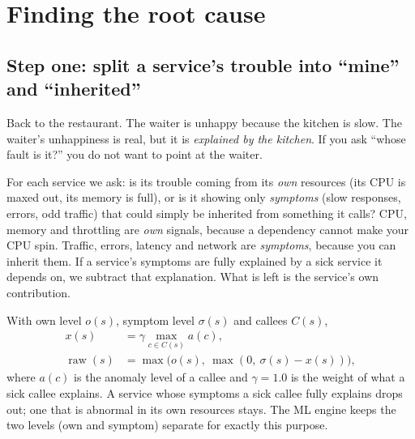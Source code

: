 \chapter{Finding the root cause}
\label{ch:rank}

\section{Step one: split a service's trouble into ``mine'' and ``inherited''}
\begin{simplebox}
Back to the restaurant. The waiter is unhappy because the kitchen is slow. The waiter's unhappiness is real, but it is \emph{explained by the kitchen}. If you ask ``whose fault is it?'' you do not want to point at the waiter.

For each service we ask: is its trouble coming from its \emph{own} resources (its CPU is maxed out, its memory is full), or is it showing only \emph{symptoms} (slow responses, errors, odd traffic) that could simply be inherited from something it calls? CPU, memory and throttling are \emph{own} signals, because a dependency cannot make your CPU spin. Traffic, errors, latency and network are \emph{symptoms}, because you can inherit them. If a service's symptoms are fully explained by a sick service it depends on, we subtract that explanation. What is left is the service's own contribution.
\end{simplebox}

\begin{techbox}
With own level $o(s)$, symptom level $\sigma(s)$ and callees $C(s)$,
\begin{align*}
x(s)&=\gamma\max_{c\in C(s)}a(c),\\
\operatorname{raw}(s)&=\max\bigl(o(s),\ \max(0,\ \sigma(s)-x(s))\bigr),
\end{align*}
where $a(c)$ is the anomaly level of a callee and $\gamma=1.0$ is the weight of what a sick callee explains. A service whose symptoms a sick callee fully explains drops out; one that is abnormal in its own resources stays. The ML engine keeps the two levels (own and symptom) separate for exactly this purpose.
\end{techbox}

